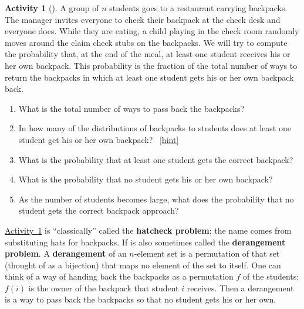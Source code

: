 \documentclass[10pt,]{book}
\newcommand{\terminology}[1]{\textbf{#1}}
\theoremstyle{plain}
\theoremstyle{definition}
\theoremstyle{definition}
\theoremstyle{definition}
\newtheorem{activity}[project]{Activity}
\numberwithin{equation}{chapter}
\begin{document}
\begin{activity}[]\label{hatcheck}
\hypertarget{p-1186}{}%
A group of \(n\) students goes to a restaurant carrying backpacks. The manager invites everyone to check their backpack at the check desk and everyone does. While they are eating, a child playing in the check room randomly moves around the claim check stubs on the backpacks. We will try to compute the probability that, at the end of the meal, at least one student receives his or her own backpack.  This probability is the fraction of the total number of ways to return the backpacks in which at least one student gets his or her own backpack back.%
\begin{enumerate}[font=\bfseries,label=(\alph*),ref=\alph*]
\item\label{task-227} \hypertarget{p-1187}{}%
What is the total number of ways to pass back the backpacks?%
\item\label{task-228} \hypertarget{p-1189}{}%
In how many of the distributions of backpacks to students does at least one student get his or her own backpack?%
~\hfill{\tiny\hyperlink{a-222.b}{[hint]}\hypertarget{q-222.b}{}}\item\label{task-229} \hypertarget{p-1193}{}%
What is the probability that at least one student gets the correct backpack?%
\item\label{hatcheckprobpart} \hypertarget{p-1195}{}%
What is the probability that no student gets his or her own backpack?%
\item\label{task-231} \hypertarget{p-1197}{}%
As the number of students becomes large, what does the probability that no student gets the correct backpack approach?%
\end{enumerate}
\end{activity}
\hypertarget{p-1199}{}%
\hyperref[hatcheck]{Activity~\ref{hatcheck}} is ``classically'' called the \terminology{hatcheck problem}; the name comes from substituting hats for backpacks. If is also sometimes called the \terminology{derangement problem}. A \terminology{derangement} of an \(n\)-element set is a permutation of that set (thought of as a bijection) that maps no element of the set to itself. One can think of a way of handing back the backpacks as a permutation \(f\) of the students: \(f(i)\) is the owner of the backpack that student \(i\) receives. Then a derangement is a way to pass back the backpacks so that no student gets his or her own.%
\typeout{************************************************}
\typeout{************************************************}
\end{document}
